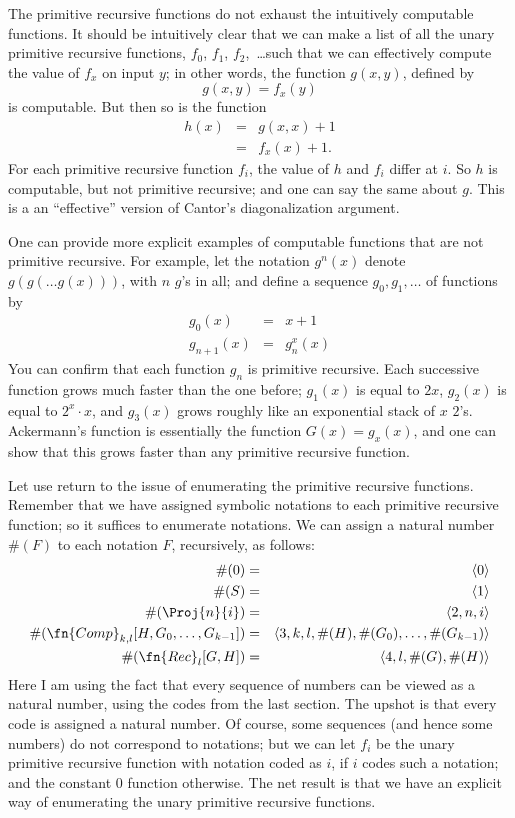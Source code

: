 \documentclass[../../include/open-logic-section]{subfiles}
\begin{document}

The primitive recursive functions do not exhaust the intuitively
computable functions. It should be intuitively clear that we can make
a list of all the unary primitive recursive functions,
$f_0$, $f_1$, $f_2$,~\dots such that we can effectively compute the value of
$f_x$ on input $y$; in other words, the function $g(x,y)$, defined by
\[
g(x,y) = f_x(y)
\] 
is computable. But then so is the function 
\begin{eqnarray*}
h(x) & = & g(x,x) + 1 \\
& = & f_x(x) +1.
\end{eqnarray*}
For each primitive recursive function $f_i$, the value of $h$ and
$f_i$ differ at $i$. So $h$ is computable, but not primitive
recursive; and one can say the same about $g$.  This is a an
``effective'' version of Cantor's diagonalization argument.

One can provide more explicit examples of computable functions that
are not primitive recursive. For example, let the notation $g^n(x)$
denote $g(g(\dots g(x)))$, with $n$ $g$'s in all; and define a
sequence $g_0,g_1,\dots$ of functions by
\begin{eqnarray*}
g_0(x) & = & x+1 \\
g_{n + 1}(x) & = & g_n^x(x)
\end{eqnarray*}
You can confirm that each function $g_n$ is primitive recursive. Each
successive function grows much faster than the one before; $g_1(x)$ is
equal to $2x$, $g_2(x)$ is equal to $2^x \cdot x$, and $g_3(x)$ grows
roughly like an exponential stack of $x$ $2$'s. Ackermann's function is
essentially the function $G(x) = g_x(x)$, and one can show that this
grows faster than any primitive recursive function.

Let use return to the issue of enumerating the primitive recursive
functions. Remember that we have assigned symbolic notations to each
primitive recursive function; so it suffices to enumerate
notations. We can assign a natural number $\#(F)$ to each notation $F$,
recursively, as follows:
\begin{eqnarray*}
\#(0) & = & \langle 0 \rangle \\
\#(S) & = & \langle 1 \rangle \\
\#(\Proj{n}{i}) & = & \langle 2, n, i \rangle \\
\#(\fn{Comp}_{k,l}[H,G_0,\dots,G_{k-1}]) & = & \langle
3,k,l,\#(H),\#(G_0),\dots,\#(G_{k-1}) \rangle \\
\#(\fn{Rec}_l[G,H]) & = & \langle 4, l, \#(G), \#(H) \rangle
\end{eqnarray*}
Here I am using the fact that every sequence of numbers can be viewed
as a natural number, using the codes from the last section. The upshot
is that every code is assigned a natural number. Of course, some
sequences (and hence some numbers) do not correspond to notations; but
we can let $f_i$ be the unary primitive recursive function with
notation coded as $i$, if $i$ codes such a notation; and the constant
$0$ function otherwise. The net result is that we have an explicit way of
enumerating the unary primitive recursive functions.
\end{document}
